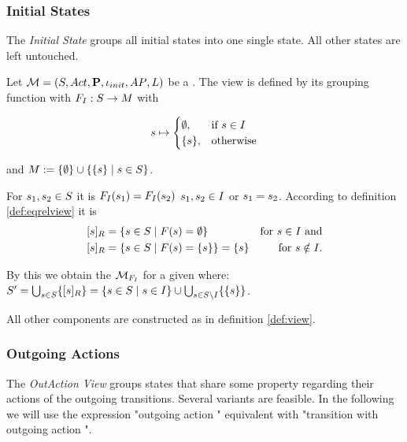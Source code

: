 \documentclass[preview]{standalone}
\begin{document}
\subsubsection{Initial States}
The \emph{Initial State \viewNC}  groups all initial states into one single state. All other states are left untouched.

\begin{definition}
	Let ${{{\mathcal{M}}}} = {{({S}, {Act}, {\textbf{P}}, {\iota_{init}}, {AP}, {L})}}$ be a \chosengraphtypeN. The view \viewinitstates is defined by its grouping function \gfctinitstates \grpfctN with ${{{{F}}_{I}}} : {S} \to {\ensuremath{{M}}}$ with 
	
	\[
	{s} \mapsto
	\begin{cases}
		\emptyset,				& \text{if } {s} \in {I} \\
		\{{s}\},          	& \text{otherwise}
	\end{cases}
	\]
	
	and ${{M}} := \{\emptyset\} \cup \{\{{s}\} \mid {s} \in {S}\}$.
\end{definition}

For ${s}_1,{s}_2 \in {S}$ it is ${{{{F}}_{I}}}({s}_1) = {{{{F}}_{I}}}({s}_2)$ \iffN ${s}_1, {s}_2 \in {I}$ or ${s}_1 = {s}_2$. According to definition \ref{def:eqrelview} it is 
\begin{align*}
	{\ensuremath{{[{s}]_{{R}}}}} &= \{{s} \in {S} \mid {F}({s}) = \emptyset\} &\text{for } {s} \in {I} \text{ and} \\
	{{[{s}]_{{R}}}} &= \{{s} \in {S} \mid {F}({s}) = \{{s}\} \} = \{{s}\} &\text{for } {s} \notin {I}.
\end{align*}


By this we obtain the \viewN ${{{{{\mathcal{M}}}}_{{{{F}}_{I}}}}}$ for a given \chosengraphtypeN \chgph where: ${S}' = \bigcup_{{s} \in {S}} \{{{[{s}]_{{R}}}}\} = \{{s} \in {S} \mid {s} \in {I}\}\cup \bigcup_{{s} \in {S} \setminus {I}}\{\{{s}\}\}$.

All other components are constructed as in definition \ref{def:view}.

\subsubsection{Outgoing Actions}
The \emph{OutAction View} groups states that share some property regarding their actions  of the outgoing transitions. Several variants are feasible. In the following we will use the expression "outgoing action \action" equivalent with "transition with outgoing action \action".
\end{document}
